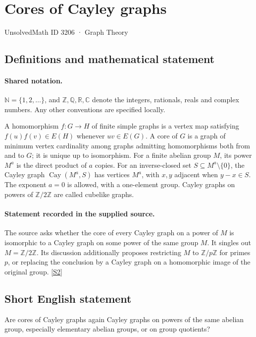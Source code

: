 \documentclass[11pt]{article}
\newcommand{\sref}[2]{\hyperlink{source:#1:#2}{[S#2]}}
\begin{document}
\setcounter{section}{3205}
\section{Cores of Cayley graphs}\label{3206}
{\small\sffamily UnsolvedMath ID 3206 · Graph Theory}
\subsection{Definitions and mathematical statement}

\paragraph{Shared notation.}$\mathbb N=\{1,2,\ldots\}$, and $\mathbb Z,\mathbb Q,\mathbb R,\mathbb C$ denote the integers, rationals, reals and complex numbers. Any other conventions are specified locally.


A homomorphism $f:G\to H$ of finite simple graphs is a vertex map satisfying $f(u)f(v)\in E(H)$ whenever $uv\in E(G)$. A core of $G$ is a graph of minimum vertex cardinality among graphs admitting homomorphisms both from and to $G$; it is unique up to isomorphism. For a finite abelian group $M$, its power $M^a$ is the direct product of $a$ copies. For an inverse-closed set $S\subseteq M^a\setminus\{0\}$, the Cayley graph $\operatorname{Cay}(M^a,S)$ has vertices $M^a$, with $x,y$ adjacent when $y-x\in S$. The exponent $a=0$ is allowed, with a one-element group. Cayley graphs on powers of $\mathbb Z/2\mathbb Z$ are called cubelike graphs.
\paragraph{Statement recorded in the supplied source.}
The source asks whether the core of every Cayley graph on a power of $M$ is isomorphic to a Cayley graph on some power of the same group $M$. It singles out $M=\mathbb Z/2\mathbb Z$. Its discussion additionally proposes restricting $M$ to $\mathbb Z/p\mathbb Z$ for primes $p$, or replacing the conclusion by a Cayley graph on a homomorphic image of the original group. \sref{3206}{2}
\subsection{Short English statement}
Are cores of Cayley graphs again Cayley graphs on powers of the same abelian group, especially elementary abelian groups, or on group quotients?
\end{document}
